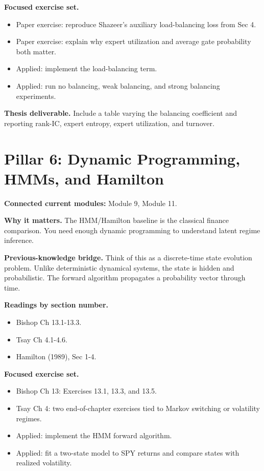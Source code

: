 \documentclass[11pt]{article}
\begin{document}
\textbf{Focused exercise set.}
\begin{itemize}
  \item Paper exercise: reproduce Shazeer's auxiliary load-balancing loss from Sec 4.
  \item Paper exercise: explain why expert utilization and average gate probability both matter.
  \item Applied: implement the load-balancing term.
  \item Applied: run no balancing, weak balancing, and strong balancing experiments.
\end{itemize}

\textbf{Thesis deliverable.} Include a table varying the balancing coefficient and reporting rank-IC, expert entropy, expert utilization, and turnover.

\section{Pillar 6: Dynamic Programming, HMMs, and Hamilton}

\textbf{Connected current modules:} Module 9, Module 11.

\textbf{Why it matters.} The HMM/Hamilton baseline is the classical finance comparison. You need enough dynamic programming to understand latent regime inference.

\textbf{Previous-knowledge bridge.} Think of this as a discrete-time state evolution problem. Unlike deterministic dynamical systems, the state is hidden and probabilistic. The forward algorithm propagates a probability vector through time.

\textbf{Readings by section number.}
\begin{itemize}
  \item Bishop Ch 13.1-13.3.
  \item Tsay Ch 4.1-4.6.
  \item Hamilton (1989), Sec 1-4.
\end{itemize}

\textbf{Focused exercise set.}
\begin{itemize}
  \item Bishop Ch 13: Exercises 13.1, 13.3, and 13.5.
  \item Tsay Ch 4: two end-of-chapter exercises tied to Markov switching or volatility regimes.
  \item Applied: implement the HMM forward algorithm.
  \item Applied: fit a two-state model to SPY returns and compare states with realized volatility.
\end{itemize}
\end{document}
